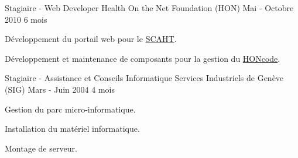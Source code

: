 \begin{cventries}
  \cventry
    {Stagiaire - Web Developer}
    {Health On the Net Foundation (HON)}
    {Mai - Octobre 2010}
    {6 mois}
    {
      \begin{cvitems}
        \item{Développement du portail web pour le
          {\color{awesome-skyblue}\href{http://scaht.org/}{SCAHT}}.
        }
        \item{Développement et maintenance de composants pour la gestion du
          {\color{awesome-skyblue}
            \href{http://www.hon.ch/HONcode/Pro/Visitor/visitor.html}{HONcode}}.
        }
      \end{cvitems}
    }

  \cventry
    {Stagiaire - Assistance et Conseils Informatique}
    {Services Industriels de Genève (SIG)}
    {Mars - Juin 2004}
    {4 mois}
    {
      \begin{cvitems}
        \item{Gestion du parc micro-informatique.}
        \item{Installation du matériel informatique.}
        \item{Montage de serveur.}
      \end{cvitems}
    }

\end{cventries}
